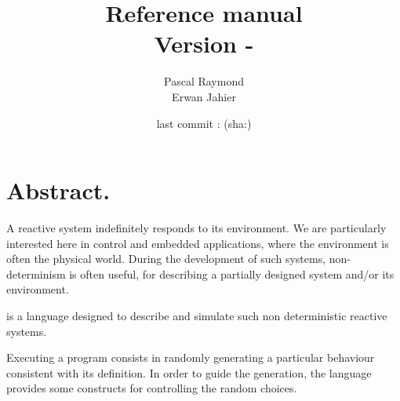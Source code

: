 \documentclass[11pt,a4paper,twoside,titlepage]{article}
\title{\lutin Reference manual\\ Version \versionname-\version{}}
\author{Pascal Raymond\\Erwan Jahier}
\date{last commit : \versiondate{} (sha:\sha)}
\begin{document}

\maketitle

\tableofcontents
\section*{Abstract.}
A reactive  system indefinitely responds  to its environment.  We are
particularly  interested here in  control and  embedded applications,
where  the  environment is  often  the  physical  world.  During  the
development  of such  systems, non-determinism  is often  useful, for
describing a partially designed system and/or its environment.

\lutin  is a  language designed  to describe  and simulate  such non
deterministic reactive systems.


Executing  a  \lutin  program  consists  in  randomly  generating  a
particular  behaviour consistent  with its  definition.  In  order to
guide  the  generation, the  language  provides  some constructs  for
controlling the random choices.





\newpage


%


\newpage


\newpage

\newpage


\newpage


\newpage





\end{document}
